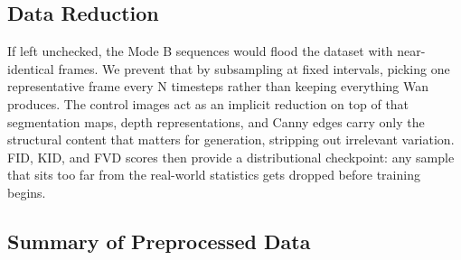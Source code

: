 \subsection{Data Reduction}

If left unchecked, the Mode B sequences would flood the dataset with near-identical frames. We prevent that by subsampling at fixed intervals, picking one representative frame every N timesteps rather than keeping everything Wan produces. The control images act as an implicit reduction on top of that segmentation maps, depth representations, and Canny edges carry only the structural content that matters for generation, stripping out irrelevant variation. FID\cite{heusel2017fid}, KID, and FVD scores then provide a distributional checkpoint: any sample that sits too far from the real-world statistics gets dropped before training begins.


\subsection{Summary of Preprocessed Data}

